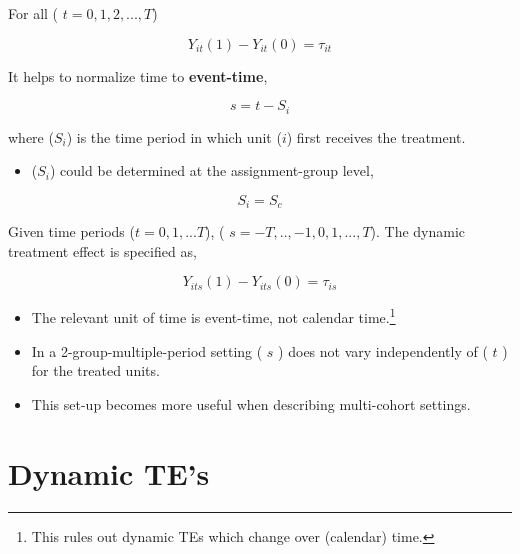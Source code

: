 \documentclass[
  letterpaper,
  DIV=11,
  numbers=noendperiod]{scrreprt}
\providecommand{\tightlist}{%
  \setlength{\itemsep}{0pt}\setlength{\parskip}{0pt}}\usepackage{longtable,booktabs,array}
\theoremstyle{definition}
\theoremstyle{remark}
\begin{document}
\begin{enumerate}
\begin{tcolorbox}
  For all ( \(t=0,1,2,...,T\))

  \[
  Y_{it}(1)-Y_{it}(0) = \tau_{it}
  \]

  \end{tcolorbox}

  It helps to normalize time to \textbf{event-time},

  \[
  s=t-S_{i}
  \]

  where (\(S_i\)) is the time period in which unit (\(i\)) first
  receives the treatment.

  \begin{itemize}
  \tightlist
  \item
    (\(S_i\)) could be determined at the assignment-group level,
  \end{itemize}

  \[
  S_i=S_c
  \]

  Given time periods (\(t=0,1,...T\)), ( \(s=-T,..,-1,0,1,...,T\)). The
  dynamic treatment effect is specified as,

  \begin{tcolorbox}[enhanced jigsaw, bottomrule=.15mm, coltitle=black, arc=.35mm, left=2mm, opacityback=0, leftrule=.75mm, colbacktitle=quarto-callout-note-color!10!white, title={Note}, toprule=.15mm, bottomtitle=1mm, breakable, colframe=quarto-callout-note-color-frame, opacitybacktitle=0.6, titlerule=0mm, colback=white, rightrule=.15mm, toptitle=1mm]

  \[
  Y_{its}(1)-Y_{its}(0) = \tau_{is}
  \]

  \end{tcolorbox}

  \begin{itemize}
  \tightlist
  \item
    The relevant unit of time is event-time, not calendar
    time.\footnote{This rules out dynamic TEs which change over
      (calendar) time.}
  \item
    In a 2-group-multiple-period setting ( \(s\) ) does not vary
    independently of ( \(t\) ) for the treated units.
  \item
    This set-up becomes more useful when describing multi-cohort
    settings.
  \end{itemize}

  \section{Dynamic TE's}\label{dynamic-tes-1}

  \begin{tcolorbox}[enhanced jigsaw, bottomrule=.15mm, coltitle=black, arc=.35mm, left=2mm, opacityback=0, leftrule=.75mm, colbacktitle=quarto-callout-note-color!10!white, title={Note}, toprule=.15mm, bottomtitle=1mm, breakable, colframe=quarto-callout-note-color-frame, opacitybacktitle=0.6, titlerule=0mm, colback=white, rightrule=.15mm, toptitle=1mm]


\end{tcolorbox}
\end{enumerate}
\end{document}
